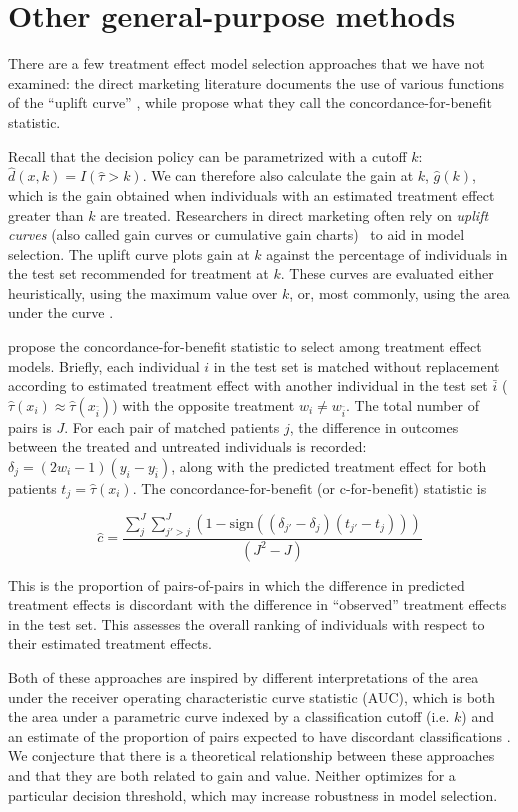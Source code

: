 \section{Other general-purpose methods}

There are a few treatment effect model selection approaches that we have not examined: the direct marketing literature documents the use of various functions of the ``uplift curve'' \cite{Gutierrez:2016tq}, while \citet{vanKlaveren:2018gg} propose what they call the concordance-for-benefit statistic. 

Recall that the decision policy can be parametrized with a cutoff $k$: $\hat d(x,k) = I(\hat\tau>k)$. We can therefore also calculate the gain at $k$, $\hat g(k)$, which is the gain obtained when individuals with an estimated treatment effect greater than $k$ are treated. Researchers in direct marketing often rely on \emph{uplift curves} (also called gain curves or cumulative gain charts) \ to aid in model selection. The uplift curve plots gain at $k$ against the percentage of individuals in the test set recommended for treatment at $k$. These curves are evaluated either heuristically, using the maximum value over $k$, or, most commonly, using the area under the curve \cite{Gutierrez:2016tq}.

\citet{vanKlaveren:2018gg} propose the concordance-for-benefit statistic to select among treatment effect models. Briefly, each individual $i$ in the test set is matched without replacement according to estimated treatment effect with another individual in the test set $\bar{i}$ ($\hat\tau(x_i) \approx \hat\tau(x_{\bar i})$) with the opposite treatment $w_i \ne w_{\bar i}$. The total number of pairs is $J$. For each pair of matched patients $j$, the difference in outcomes between the treated and untreated individuals is recorded: $\delta_j = (2w_i - 1)(y_i -y_{\bar i})$, along with the predicted treatment effect for both patients $t_j = \hat\tau(x_i)$. The concordance-for-benefit (or c-for-benefit) statistic is

\[
\hat c = \frac{\sum_j^J \sum_{j' > j}^J (1 - \text{sign}((\delta_{j'} - \delta_j)(t_{j'} - t_j))) }{(J^2-J)}
\]

This is the proportion of pairs-of-pairs in which the difference in predicted treatment effects is discordant with the difference in ``observed'' treatment effects in the test set. This assesses the overall ranking of individuals with respect to their estimated treatment effects.

Both of these approaches are inspired by different interpretations of the area under the receiver operating characteristic curve statistic (AUC), which is both the area under a parametric curve indexed by a classification cutoff (i.e. $k$) and an estimate of the proportion of pairs expected to have discordant classifications \cite{Hanley:1982cz}. We conjecture that there is a theoretical relationship between these approaches and that they are both related to gain and value. Neither optimizes for a particular decision threshold, which may increase robustness in model selection.

